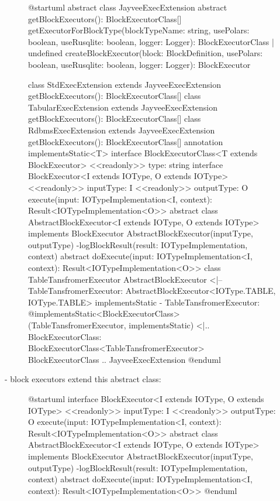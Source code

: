 \begin{figure}
	\begin{plantuml}
		@startuml
		abstract class JayveeExecExtension {
				{abstract} getBlockExecutors(): BlockExecutorClass[]
				getExecutorForBlockType(blockTypeName: string, usePolars: boolean, useRusqlite: boolean, logger: Logger): BlockExecutorClass | undefined
				createBlockExecutor(block: BlockDefinition, usePolars: boolean, useRusqlite: boolean, logger: Logger): BlockExecutor
			}

		class StdExecExtension extends JayveeExecExtension {
				getBlockExecutors(): BlockExecutorClass[]
			}
		class TabularExecExtension extends JayveeExecExtension {
				getBlockExecutors(): BlockExecutorClass[]
			}
		class RdbmsExecExtension extends JayveeExecExtension {
				getBlockExecutors(): BlockExecutorClass[]
			}
		annotation implementsStatic<T>
		interface BlockExecutorClass<T extends BlockExecutor> {
				<<readonly>> type: string
			}
		interface BlockExecutor<I extends IOType, O extends IOType> {
				<<readonly>> inputType: I
				<<readonly>> outputType: O
				execute(input: IOTypeImplementation<I\>, context): Result<IOTypeImplementation<O>>
			}
		abstract class AbstractBlockExecutor<I extends IOType, O extends IOType> implements BlockExecutor {
				AbstractBlockExecutor(inputType, outputType)
				-logBlockResult(result: IOTypeImplementation, context)
				{abstract} doExecute(input: IOTypeImplementation<I\>, context): Result<IOTypeImplementation<O>>
			}
		class TableTansfromerExecutor {}
		AbstractBlockExecutor <|-- TableTansfromerExecutor: AbstractBlockExecutor<IOType.TABLE, IOType.TABLE>
		implementsStatic - TableTansfromerExecutor: @implementsStatic<BlockExecutorClass>
		(TableTansfromerExecutor, implementsStatic) <|.. BlockExecutorClass: BlockExecutorClass<TableTansfromerExecutor>
		BlockExecutorClass .. JayveeExecExtension
		@enduml
	\end{plantuml}
	\caption{}
	\label{fig:}
\end{figure}

- block executors extend this abstract class:
\begin{figure}
	\begin{plantuml}
		@startuml
		interface BlockExecutor<I extends IOType, O extends IOType> {
				<<readonly>> inputType: I
				<<readonly>> outputType: O
				execute(input: IOTypeImplementation<I\>, context): Result<IOTypeImplementation<O>>
			}
		abstract class AbstractBlockExecutor<I extends IOType, O extends IOType> implements BlockExecutor {
				AbstractBlockExecutor(inputType, outputType)
				-logBlockResult(result: IOTypeImplementation, context)
				{abstract} doExecute(input: IOTypeImplementation<I\>, context): Result<IOTypeImplementation<O>>
			}
		@enduml
	\end{plantuml}
	\caption{} %
	\label{fig:uml:abstractblockexecutor}
\end{figure}

